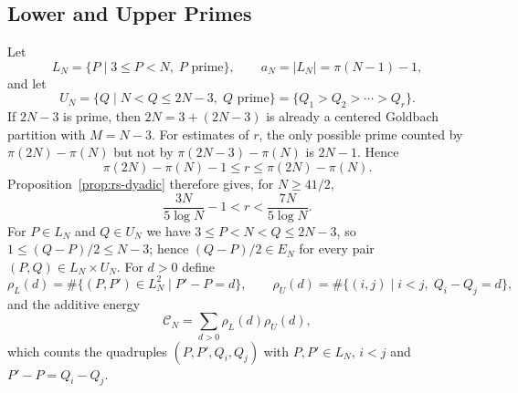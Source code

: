 \documentclass[11pt]{amsart}
\theoremstyle{definition}
\theoremstyle{remark}
\begin{document}
\subsection{Lower and Upper Primes}\label{subsec:upper-prime-count}
Let
\[
L_N=\{P\mid 3\leq P<N,\; P \text{ prime}\},\qquad
a_N=|L_N|=\pi(N-1)-1,
\]
and let
\[
U_N=\{Q\mid N<Q\leq 2N-3,\; Q \text{ prime}\}
=\{Q_1>Q_2>\cdots>Q_r\}.
\]
If $2N-3$ is prime, then $2N=3+(2N-3)$ is already a centered Goldbach partition with $M=N-3$. For estimates of $r$, the only possible prime counted by $\pi(2N)-\pi(N)$ but not by $\pi(2N-3)-\pi(N)$ is $2N-1$. Hence
\[
\pi(2N)-\pi(N)-1\leq r\leq \pi(2N)-\pi(N).
\]
Proposition~\ref{prop:rs-dyadic} therefore gives, for $N\geq 41/2$,
\[
\frac{3N}{5\log N}-1<r<\frac{7N}{5\log N}.
\]
For $P\in L_N$ and $Q\in U_N$ we have $3\leq P<N<Q\leq 2N-3$, so $1\leq (Q-P)/2\leq N-3$; hence $(Q-P)/2\in E_N$ for every pair $(P,Q)\in L_N\times U_N$. For $d>0$ define
\[
\rho_L(d)=\#\{(P,P')\in L_N^2\mid P'-P=d\},
\qquad
\rho_U(d)=\#\{(i,j)\mid i<j,\; Q_i-Q_j=d\},
\]
and the additive energy
\[
\mathcal C_N
=
\sum_{d>0}\rho_L(d)\rho_U(d),
\]
which counts the quadruples $(P,P',Q_i,Q_j)$ with $P,P'\in L_N$, $i<j$ and $P'-P=Q_i-Q_j$.
\end{document}
